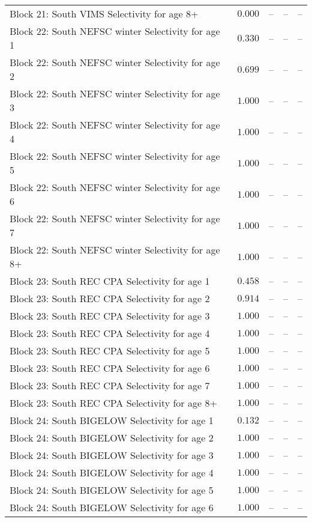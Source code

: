 \documentclass[
]{article}
\begin{document}
\begin{landscape}
\begin{longtable}[t]{lrrrr}
Block 21: South VIMS Selectivity for age 8+ & $0.000$ & -- & -- & --\\
\addlinespace
Block 22: South NEFSC winter Selectivity for age 1 & $0.330$ & -- & -- & --\\
Block 22: South NEFSC winter Selectivity for age 2 & $0.699$ & -- & -- & --\\
Block 22: South NEFSC winter Selectivity for age 3 & $1.000$ & -- & -- & --\\
Block 22: South NEFSC winter Selectivity for age 4 & $1.000$ & -- & -- & --\\
Block 22: South NEFSC winter Selectivity for age 5 & $1.000$ & -- & -- & --\\
\addlinespace
Block 22: South NEFSC winter Selectivity for age 6 & $1.000$ & -- & -- & --\\
Block 22: South NEFSC winter Selectivity for age 7 & $1.000$ & -- & -- & --\\
Block 22: South NEFSC winter Selectivity for age 8+ & $1.000$ & -- & -- & --\\
Block 23: South REC CPA Selectivity for age 1 & $0.458$ & -- & -- & --\\
Block 23: South REC CPA Selectivity for age 2 & $0.914$ & -- & -- & --\\
\addlinespace
Block 23: South REC CPA Selectivity for age 3 & $1.000$ & -- & -- & --\\
Block 23: South REC CPA Selectivity for age 4 & $1.000$ & -- & -- & --\\
Block 23: South REC CPA Selectivity for age 5 & $1.000$ & -- & -- & --\\
Block 23: South REC CPA Selectivity for age 6 & $1.000$ & -- & -- & --\\
Block 23: South REC CPA Selectivity for age 7 & $1.000$ & -- & -- & --\\
\addlinespace
Block 23: South REC CPA Selectivity for age 8+ & $1.000$ & -- & -- & --\\
Block 24: South BIGELOW Selectivity for age 1 & $0.132$ & -- & -- & --\\
Block 24: South BIGELOW Selectivity for age 2 & $1.000$ & -- & -- & --\\
Block 24: South BIGELOW Selectivity for age 3 & $1.000$ & -- & -- & --\\
Block 24: South BIGELOW Selectivity for age 4 & $1.000$ & -- & -- & --\\
\addlinespace
Block 24: South BIGELOW Selectivity for age 5 & $1.000$ & -- & -- & --\\
Block 24: South BIGELOW Selectivity for age 6 & $1.000$ & -- & -- & --\\

\end{longtable}
\end{landscape}
\end{document}
